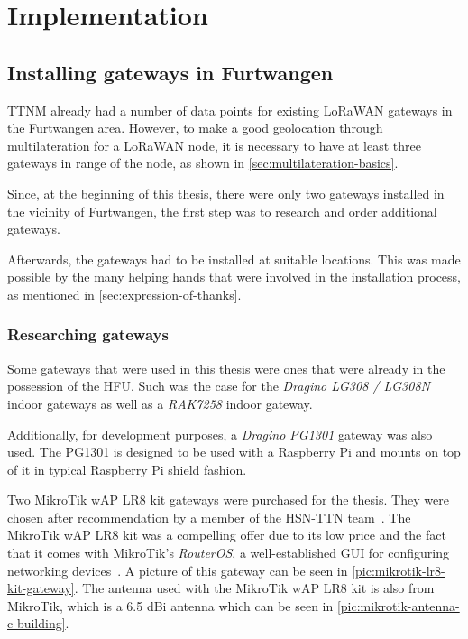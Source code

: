 \chapter{Implementation}

\section{Installing gateways in Furtwangen}

\ac{TTNM} already had a number of data points for existing \ac{LoRaWAN} gateways in the Furtwangen area.
However, to make a good geolocation through multilateration for a \ac{LoRaWAN} node, it is necessary to have at least three gateways in range of the node, as shown in \cref{sec:multilateration-basics}.

Since, at the beginning of this thesis, there were only two gateways installed in the vicinity of Furtwangen, the first step was to research and order additional gateways.

Afterwards, the gateways had to be installed at suitable locations.
This was made possible by the many helping hands that were involved in the installation process, as mentioned in \cref{sec:expression-of-thanks}.

\subsection{Researching gateways}

Some gateways that were used in this thesis were ones that were already in the possession of the \ac{HFU}.
Such was the case for the \emph{Dragino LG308 / LG308N} indoor gateways as well as a \emph{RAK7258} indoor gateway.

Additionally, for development purposes, a \emph{Dragino PG1301} gateway was also used.
The PG1301 is designed to be used with a Raspberry Pi and mounts on top of it in typical Raspberry Pi shield fashion.

Two MikroTik wAP LR8 kit gateways were purchased for the thesis.
They were chosen after recommendation by a member of the \ac{HSN-TTN} team~\cite{hochschwarzwald_smart_net_-_thethingsnetwork_eingesetzte_nodate}.
The MikroTik wAP LR8 kit was a compelling offer due to its low price and the fact that it comes with MikroTik's \emph{RouterOS}, a well-established GUI for configuring networking devices~\cite{mikrotik_mikrotik_nodate}.
A picture of this gateway can be seen in \cref{pic:mikrotik-lr8-kit-gateway}.
The antenna used with the MikroTik wAP LR8 kit is also from MikroTik, which is a 6.5 dBi antenna which can be seen in \cref{pic:mikrotik-antenna-c-building}.

